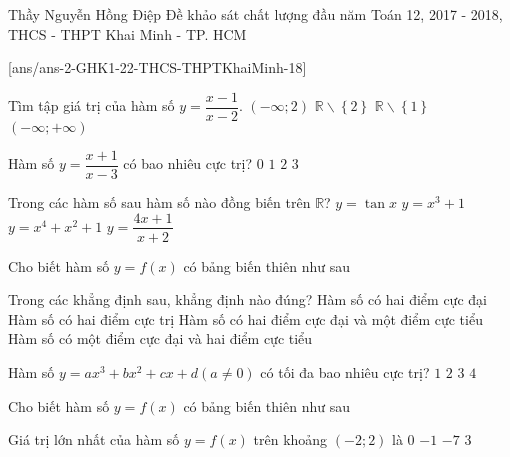 
\begin{name}
{Thầy Nguyễn Hồng Điệp}
{Đề khảo sát chất lượng đầu năm Toán 12, 2017 - 2018, THCS - THPT Khai Minh - TP. HCM}
\end{name}
\setcounter{ex}{0}
[ans/ans-2-GHK1-22-THCS-THPTKhaiMinh-18]

\begin{ex}%
	Tìm tập giá trị của hàm số $y= \dfrac{x-1}{x-2}$.
	\choice
	{ $\left( -\infty  ; 2 \right)$ }
	{ $\mathbb{R}\backslash \left\{ 2 \right\}$}
	{\True $\mathbb{\mathbb{R}}\backslash \left\{ 1 \right\}$}
	{ $\left( -\infty  ; +\infty  \right)$}
\end{ex}
\begin{ex}%
	Hàm số $y= \dfrac{x+1}{x-3}$ có bao nhiêu cực trị?
	\choice
	{\True $0$}
	{$1$}
	{$2$}	
	{$3$}
\end{ex}
\begin{ex}%
	Trong các hàm số sau hàm số nào đồng biến trên $\mathbb{R}$?
	\choice
	{$y=\tan x$ }
	{\True $y=x^3+1$}
	{$y=x^4+x^2+1$}
	{$y= \dfrac{4x+1}{x+2}$}	
\end{ex}
\begin{ex}%
	Cho biết hàm số $y=f\left( x \right)$ có bảng biến thiên như sau
	\begin{center}
	\end{center}
	Trong các khẳng định sau, khẳng định nào đúng?
	\choice
	{ Hàm số có hai điểm cực đại}
	{ Hàm số có hai điểm cực trị}
	{ Hàm số có hai điểm cực đại và một điểm cực tiểu}
	{\True Hàm số có một điểm cực đại và hai điểm cực tiểu}	
\end{ex}
\begin{ex}%
	Hàm số $y=ax^3+bx^2+cx+d  \left( a\ne 0 \right)$ có tối đa bao nhiêu cực trị?
	\choice
	{$1$}
	{\True $2$}
	{$3$}			
	{$4$}
\end{ex}
\begin{ex}%
	Cho biết hàm số $y=f(x)$ có bảng biến thiên như sau
	\begin{center}
	\end{center}
	Giá trị lớn nhất của hàm số $y=f(x)$ trên khoảng $\left( -2 ; 2 \right)$ là
	\choice
	{$0$}
	{$-1$}
	{$-7$}
	{\True $3$}
\end{ex}
